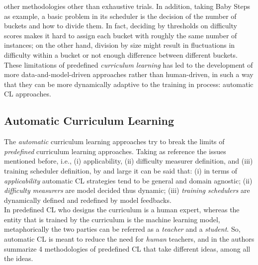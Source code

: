 other methodologies other than exhaustive trials. In addition, taking Baby Steps as example, 
a basic problem in its scheduler is the decision of the number of buckets and how to divide them. In fact, 
deciding by thresholds on difficulty scores makes it hard to assign each bucket with roughly the same number of instances; on 
the other hand, division by size might result in fluctuations in difficulty within a bucket or not enough difference between different 
buckets.\\
\newline
These limitations of predefined \textit{curriculum learning} has led to the development 
of more data-and-model-driven approaches rather than human-driven, in such a way 
that they can be more dynamically adaptive to the training in process: automatic 
CL approaches.

\subsection{Automatic Curriculum Learning}
The \textit{automatic} curriculum learning approaches try to break the limits of \textit{predefined} curriculum learning approaches.
Taking as reference the issues mentioned before, i.e., (i) applicability, (ii) difficulty measurer definition, and (iii) training scheduler definition, 
by and large it can be said that: (i) in terms of \textit{applicability} automatic CL strategies 
tend to be general and domain agnostic; (ii) \textit{difficulty measurers} are model decided thus dynamic; (iii) \textit{training schedulers}
are dynamically defined and redefined by model feedbacks.\\
In predefined CL who designs the curriculum is a human expert, whereas the entity that is trained
by the curriculum is the machine learning model, metaphorically the two parties can be referred as 
a \textit{teacher} and a \textit{student}. So, automatic CL is meant
to reduce the need for \textit{human} teachers, and in \cite{wang2021survey} the authors summarize 
4 methodologies of predefined CL that take different ideas, among all the ideas.

